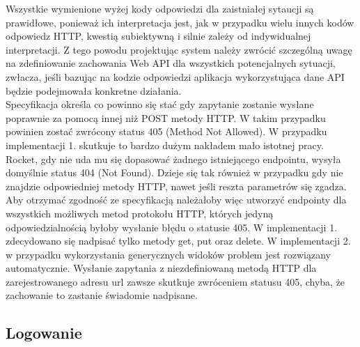 \documentclass[12pt, notitlepage]{article}
\begin{document}
Wszystkie wymienione wyżej kody odpowiedzi dla zaistniałej sytaucji są prawidłowe, ponieważ ich interpretacja jest, jak w przypadku wielu innych kodów odpowiedz HTTP, kwestią subiektywną i silnie zależy od indywidualnej interpretacji. Z tego powodu projektując system należy zwrócić szczególną uwagę na zdefiniowanie zachowania Web API dla wszystkich potencjalnych sytuacji, zwłacza, jeśli bazując na kodzie odpowiedzi aplikacja wykorzystująca dane API będzie podejmowała konkretne działania. \\
Specyfikacja określa co powinno się stać gdy zapytanie zostanie wysłane poprawnie za pomocą innej niż POST metody HTTP. W takim przypadku powinien zostać zwrócony status 405 (Method Not Allowed). W przypadku implementacji 1. skutkuje to bardzo dużym nakładem mało istotnej pracy. Rocket, gdy nie uda mu się dopasować żadnego istniejącego endpointu, wysyła domyślnie status 404 (Not Found). Dzieje się tak również w przypadku gdy nie znajdzie odpowiedniej metody HTTP, nawet jeśli reszta parametrów się zgadza. Aby otrzymać zgodność ze specyfikacją należałoby więc utworzyć endpointy dla wszystkich możliwych metod protokołu HTTP, których jedyną odpowiedzialnością byłoby wysłanie błędu o statusie 405. W implementacji 1. zdecydowano się nadpisać tylko metody get, put oraz delete.
W implementacji 2. w przypadku wykorzystania generycznych widoków problem jest rozwiązany automatycznie. Wysłanie zapytania z niezdefiniowaną metodą HTTP dla zarejestrowanego adresu url zawsze skutkuje zwróceniem statusu 405, chyba, że zachowanie to zastanie świadomie nadpisane.

\subsection{Logowanie}\label{sec:logowanie}
\end{document}
